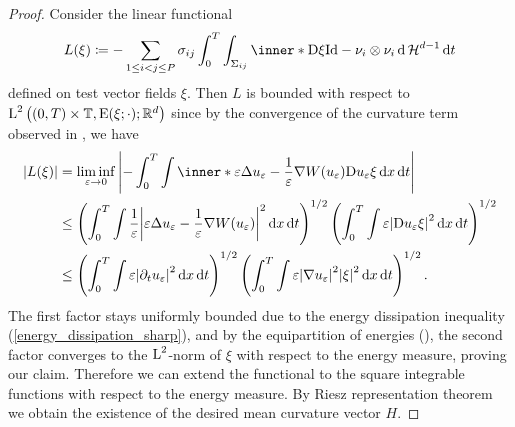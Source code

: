 \begin{proof}
	Consider the linear functional 
	\begin{equation*}
		L ( \xi )
		\coloneqq
		- \sum_{ 1 \leq i < j \leq P }
			\sigma_{ i j }
			\int_{ 0 }^{ T }
				\int_{ \Sigma_{ i j } }
					\inner*{ \diff \xi }{ \mathrm{Id} - \nu_{ i } \otimes \nu_{ 
					i } }
				\dd{ \hm^{ d - 1 } }
			\dd{ t }
	\end{equation*}
	defined on test vector fields $ \xi $. Then $ L $ is bounded with respect 
	to $ \operatorname{L}^{ 2 } \left( ( 0 , T ) \times \operatorname{\mathbb{T}} ,\operatorname{E} ( \xi ; \cdot ) 
	; \mathbb{ R }^{ d }
	 \right) $ since by the convergence of the curvature 
	term observed in , we have
	\begin{align*}
		\abs{ L ( \xi ) }
		& =
		\liminf_{ \varepsilon \to 0 }
			\abs{ 
				-
				\int_{ 0 }^{ T }
					\int
						\inner*{
							\varepsilon \Delta u_{ \varepsilon } 
							-
							\frac{ 1 }{ \varepsilon }
							\nabla W ( u_{ \varepsilon } )
						}
						{ \diff u_{ \varepsilon } \xi }
					\dd{ x }
				\dd{ t }
			}
		\\
		& \leq
		\left(
			\int_{ 0 }^{ T }
				\int
					\frac{ 1 }{ \varepsilon }
					\abs{ 
						\varepsilon \Delta u_{ \varepsilon }
						-
						\frac{ 1 }{ \varepsilon }
						\nabla W ( u_{ \varepsilon } )
					}^{ 2 }
				\dd{ x }
			\dd{ t }
		\right)^{ 1/2 }
		\left(
			\int_{ 0 }^{ T }
				\int
					\varepsilon
					\abs{ \diff u_{ \varepsilon } \xi }^{ 2 }
				\dd{ x }
			\dd{ t }
		\right)^{ 1/2 }
		\\
		& \leq
				\left(
		\int_{ 0 }^{ T }
		\int
		 \varepsilon
		\abs{ 
		\partial_{ t } u_{ \varepsilon }
		}^{ 2 }
		\dd{ x }
		\dd{ t }
		\right)^{ 1/2 }
		\left(
		\int_{ 0 }^{ T }
		\int
		\varepsilon
		\abs{ \nabla u_{ \varepsilon } }^{ 2 }
		\abs{ \xi }^{ 2 }
		\dd{ x }
		\dd{ t }
		\right)^{ 1/2 }.
	\end{align*}
	The first factor stays uniformly bounded due to the energy dissipation 
	inequality (\ref{energy_dissipation_sharp}), and by the equipartition of 
	energies (), the second factor 
	converges to the $ \operatorname{L}^{ 2 } $-norm of $ \xi $ with respect to the energy 
	measure, proving our claim. Therefore we can extend the functional to 
	the square integrable functions with respect to the energy measure. By 
	Riesz representation theorem we obtain the existence of the desired mean 
	curvature vector $ H $.
	

\end{proof}
